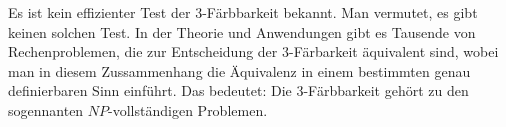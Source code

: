 \begin{bem}
	Es ist kein effizienter Test der $3$-Färbbarkeit bekannt. Man vermutet, es gibt keinen solchen Test. 
	In der Theorie und Anwendungen gibt es Tausende von Rechenproblemen, die zur Entscheidung der $3$-Färbarkeit äquivalent sind, wobei man in diesem Zussammenhang die Äquivalenz in einem bestimmten genau definierbaren Sinn einführt. Das bedeutet: Die $3$-Färbbarkeit gehört zu den sogennanten $NP$-vollständigen Problemen. 
\end{bem} 